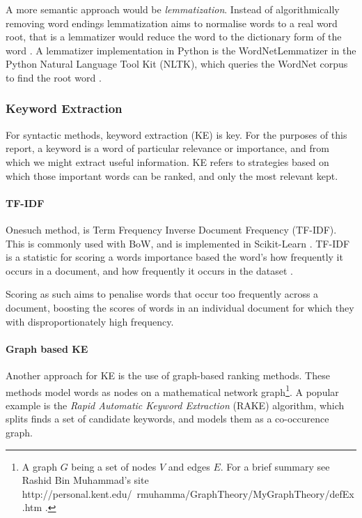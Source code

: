 A more semantic approach would be \emph{lemmatization}. Instead of algorithmically removing word endings lemmatization 
aims to normalise words to a real word root, that is a lemmatizer would reduce the word to the dictionary
form of the word \cite{Jayakodi2016}.  A lemmatizer implementation in Python is the WordNetLemmatizer in the Python 
Natural Language Tool Kit (NLTK), which queries the WordNet corpus to find the root word 
\cite{StevenBirdEwanKlein2009, princetonuniversity_2010}. 
 
\subsubsection{Keyword Extraction}\label{sssec:kwe}
For syntactic methods, keyword extraction (KE) is key.  For the purposes of this report, a keyword is a word of particular
relevance or importance, and from which we might extract useful information.  KE refers to strategies
based on which those important words can be ranked, and only the most relevant kept.

\paragraph{TF-IDF}\label{ssec:tfidf}

Onesuch method, is Term Frequency Inverse Document Frequency (TF-IDF). This is commonly used with BoW, and is 
implemented in Scikit-Learn \cite{Barupal2011}.  TF-IDF is a statistic for scoring a words importance based the word's
how frequently it occurs in a document, and how frequently it occurs in the dataset \cite{Ramos2003}.

Scoring as such aims to penalise words that occur too frequently across a document, boosting the scores of words in an 
individual document for which they with disproportionately high frequency.

\paragraph{Graph based KE}\label{sssec:gbkwe}

Another approach for KE is the use of graph-based ranking methods.  These methods model words as
nodes on a mathematical network graph\footnote{A graph $G$ being a set of nodes $V$ and edges $E$.  For a brief 
summary see Rashid Bin Muhammad's site http://personal.kent.edu/~rmuhamma/GraphTheory/MyGraphTheory/defEx.htm
\cite{muhammad}.}.  A popular example is the \emph{Rapid Automatic Keyword Extraction} (RAKE) algorithm, which
splits finds a set of candidate keywords, and models them as a co-occurence graph.  

